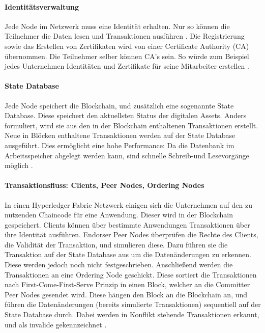 \paragraph{Identitätsverwaltung}
Jede Node im Netzwerk muss eine Identität erhalten. Nur so können die Teilnehmer die Daten lesen und Transaktionen ausführen \cite{SchererPerformanceScalabilityBlockchain2017}. Die Registrierung sowie das Erstellen von Zertifikaten wird von einer Certificate Authority (CA) übernommen. Die Teilnehmer selber können CA's sein. So würde zum Beispiel jedes Unternehmen Identitäten und Zertifikate für seine Mitarbeiter erstellen \cite{HyperledgerFabricTeamCAHyperledgerFabric}.

\paragraph{State Database}
Jede Node speichert die Blockchain, und zusätzlich eine sogenannte State Database. Diese speichert den aktuellsten Status der digitalen Assets. Anders formuliert, wird sie aus den in der Blockchain enthaltenen Transaktionen erstellt. Neue in Blöcken enthaltene Transaktionen werden auf der State Database ausgeführt. Dies ermöglicht eine hohe Performance: Da die Datenbank im Arbeitsspeicher abgelegt werden kann, sind schnelle Schreib-und Lesevorgänge möglich \cite{SchererPerformanceScalabilityBlockchain2017}.

\paragraph{Transaktionsfluss: Clients, Peer Nodes, Ordering Nodes}
In einen Hyperledger Fabric Netzwerk einigen sich die Unternehmen auf den zu nutzenden Chaincode für eine Anwendung. Dieser wird in der Blockchain gespeichert. Clients können über bestimmte Anwendungen Transaktionen über ihre Identität ausführen. Endorser Peer Nodes überprüfen die Rechte des Clients, die Validität der Transaktion, und simulieren diese. Dazu führen sie die Transaktion auf der State Database aus um die Datenänderungen zu erkennen. Diese werden jedoch noch nicht festgeschrieben. Anschließend werden die Transaktionen an eine Ordering Node geschickt. Diese sortiert die Transaktionen nach First-Come-First-Serve Prinzip in einen Block, welcher an die Committer Peer Nodes gesendet wird. Diese hängen den Block an die Blockchain an, und führen die Datenänderungen (bereits simulierte Transaktionen) sequentiell auf der State Database durch. Dabei werden in Konflikt stehende Transaktionen erkannt, und als invalide gekennzeichnet \cite{SchererPerformanceScalabilityBlockchain2017}.

